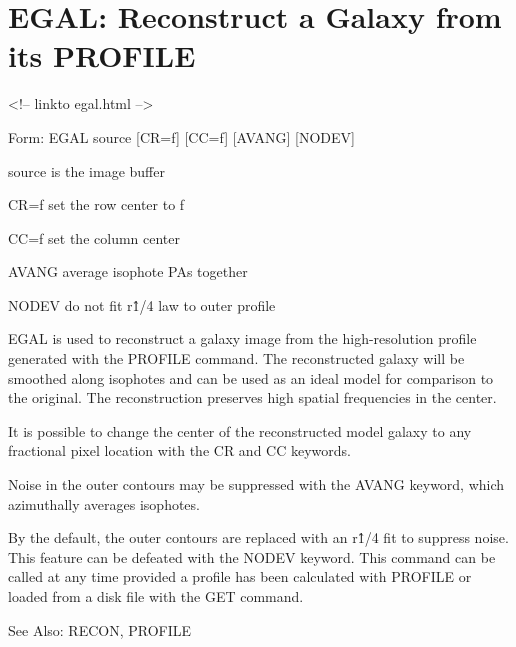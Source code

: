 \section{EGAL: Reconstruct a Galaxy from its PROFILE}
\begin{rawhtml}
<!-- linkto egal.html -->
\end{rawhtml}
\begin{command}
  \item[Form: EGAL source {[CR=f]} {[CC=f]} {[AVANG]} {[NODEV]}\hfill]{}
  \item[source]{is the image buffer}
  \item[CR=f]{set the row center to f}
  \item[CC=f]{set the column center}
  \item[AVANG]{average isophote PAs together}
  \item[NODEV]{do not fit r\^1/4 law to outer profile}
\end{command}

EGAL is used to reconstruct a galaxy image from the high-resolution profile
generated with the PROFILE command.  The reconstructed galaxy will be
smoothed along isophotes and can be used as an ideal model for comparison
to the original.  The reconstruction preserves high spatial frequencies in
the center.  

It is possible to change the center of the reconstructed model galaxy to
any fractional pixel location with the CR and CC keywords.  

Noise in the outer contours may be suppressed with the AVANG keyword, which
azimuthally averages isophotes.  

By the default, the outer contours are replaced with an r\^1/4 fit to
suppress noise.  This feature can be defeated with the NODEV keyword.  This
command can be called at any time provided a profile has been calculated
with PROFILE or loaded from a disk file with the GET command.

See Also: RECON, PROFILE


